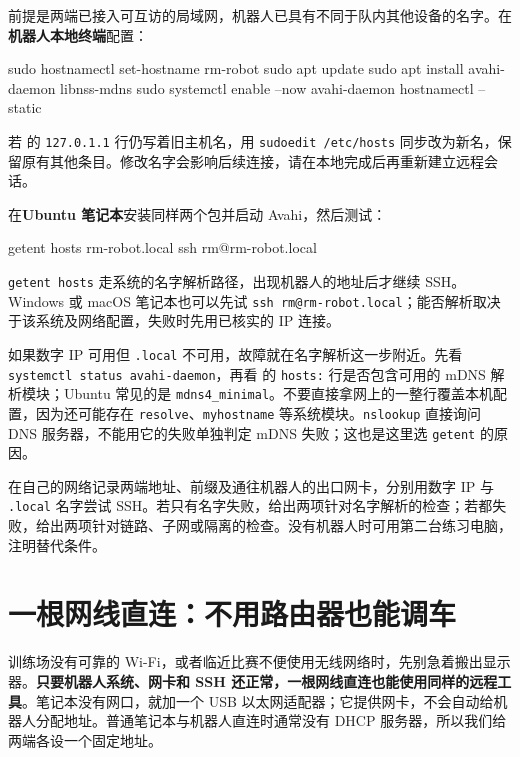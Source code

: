 \begin{example}
前提是两端已接入可互访的局域网，机器人已具有不同于队内其他设备的名字。在\textbf{机器人本地终端}配置：
\begin{tbash}
sudo hostnamectl set-hostname rm-robot
sudo apt update
sudo apt install avahi-daemon libnss-mdns
sudo systemctl enable --now avahi-daemon
hostnamectl --static
\end{tbash}
若  的 \texttt{127.0.1.1} 行仍写着旧主机名，用 \texttt{sudoedit /etc/hosts} 同步改为新名，保留原有其他条目。修改名字会影响后续连接，请在本地完成后再重新建立远程会话。

在\textbf{Ubuntu 笔记本}安装同样两个包并启动 Avahi，然后测试：
\begin{tbash}
getent hosts rm-robot.local
ssh rm@rm-robot.local
\end{tbash}
\texttt{getent hosts} 走系统的名字解析路径，出现机器人的地址后才继续 SSH。Windows 或 macOS 笔记本也可以先试 \texttt{ssh rm@rm-robot.local}；能否解析取决于该系统及网络配置，失败时先用已核实的 IP 连接。
\end{example}

如果数字 IP 可用但 \texttt{.local} 不可用，故障就在名字解析这一步附近。先看 \texttt{systemctl status avahi-daemon}，再看  的 \texttt{hosts:} 行是否包含可用的 mDNS 解析模块；Ubuntu 常见的是 \texttt{mdns4\_minimal}。不要直接拿网上的一整行覆盖本机配置，因为还可能存在 \texttt{resolve}、\texttt{myhostname} 等系统模块。\texttt{nslookup} 直接询问 DNS 服务器，不能用它的失败单独判定 mDNS 失败；这也是这里选 \texttt{getent} 的原因。

\begin{exercise}\label{ex:deploy-lan}
在自己的网络记录两端地址、前缀及通往机器人的出口网卡，分别用数字 IP 与 \texttt{.local} 名字尝试 SSH。若只有名字失败，给出两项针对名字解析的检查；若都失败，给出两项针对链路、子网或隔离的检查。没有机器人时可用第二台练习电脑，注明替代条件。
\end{exercise}

\section{一根网线直连：不用路由器也能调车}
\label{sec:deploy-wired}

训练场没有可靠的 Wi-Fi，或者临近比赛不便使用无线网络时，先别急着搬出显示器。\textbf{只要机器人系统、网卡和 SSH 还正常，一根网线直连也能使用同样的远程工具}。笔记本没有网口，就加一个 USB 以太网适配器；它提供网卡，不会自动给机器人分配地址。普通笔记本与机器人直连时通常没有 DHCP 服务器，所以我们给两端各设一个固定地址。

